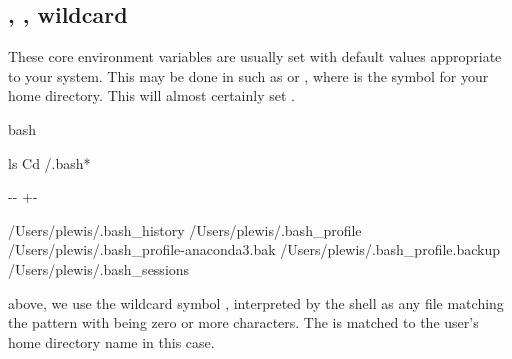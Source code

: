 \documentclass[letterpaper,10pt,english]{sphinxmanual}
\newlength\nbsphinxcodecellspacing
\begin{document}
\subsection{, , wildcard \sphinxstyleliteralintitle{\sphinxupquote{*}}}
\label{\detokenize{Appendix1:.bash_profile,-.bashrc,-wildcard-*}}
These core environment variables are usually set with default values appropriate to your system. This may be done in  such as  or , where \sphinxcode{\sphinxupquote{\textasciitilde{}}} is the symbol for your home directory. This will almost certainly set .

{
\begin{sphinxVerbatim}[commandchars=\\\{\}]
\llap{\color{nbsphinxin}[9]:\,\hspace{\fboxrule}\hspace{\fboxsep}}\PYGZpc{}\PYGZpc{}bash

ls \PYGZhy{}Cd  \PYGZti{}/.bash*
\end{sphinxVerbatim}
}

{

\kern-\sphinxverbatimsmallskipamount\kern-\baselineskip
\kern+\FrameHeightAdjust\kern-\fboxrule
\vspace{\nbsphinxcodecellspacing}

\begin{sphinxVerbatim}[commandchars=\\\{\}]
/Users/plewis/.bash\_history
/Users/plewis/.bash\_profile
/Users/plewis/.bash\_profile-anaconda3.bak
/Users/plewis/.bash\_profile.backup
/Users/plewis/.bash\_sessions
\end{sphinxVerbatim}
}

above, we use the wildcard symbol \sphinxcode{\sphinxupquote{*}}, interpreted by the shell as any file matching the pattern  with \sphinxcode{\sphinxupquote{*}} being zero or more characters. The \sphinxcode{\sphinxupquote{\textasciitilde{}}} is matched to the user’s home directory name in this case.
\end{document}
